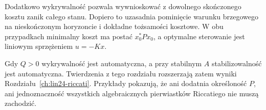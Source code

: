 Dodatkowo
wykrywalność pozwala
wywnioskować z dowolnego
skończonego kosztu
zanik całego stanu.
Dopiero to uzasadnia
pominięcie warunku
brzegowego na nieskończonym
horyzoncie i dokładne
tożsamości kosztowe.
W obu przypadkach
minimalny koszt ma postać
\(x_0^*Px_0\),
a optymalne sterowanie
jest liniowym sprzężeniem
\(u=-Kx\).

Gdy \(Q>0\)
wykrywalność jest automatyczna,
a przy stabilnym \(A\)
stabilizowalność jest
automatyczna.
Twierdzenia z tego rozdziału
rozszerzają zatem
wyniki
Rozdziału~\ref{ch:lin24-riccati}.
Przykłady pokazują,
że ani dodatnia
określoność \(P\),
ani jednoznaczność
wszystkich algebraicznych
pierwiastków Riccatiego
nie muszą zachodzić.
